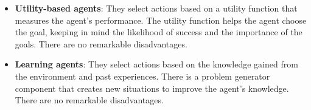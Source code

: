 \documentclass[12pt]{article}
\begin{document}
\begin{enumerate}[label=\textbf{A.\arabic*}]
\begin{itemize}
              \item \textbf{Utility-based agents}: They select actions based on a utility function that measures the agent's performance. The utility function helps the agent choose the goal, keeping in mind the likelihood of success and the importance of the goals. There are no remarkable disadvantages.

              \item \textbf{Learning agents}: They select actions based on the knowledge gained from the environment and past experiences. There is a problem generator component that creates new situations to improve the agent's knowledge. There are no remarkable disadvantages.
          \end{itemize}
\end{enumerate}
\end{document}
